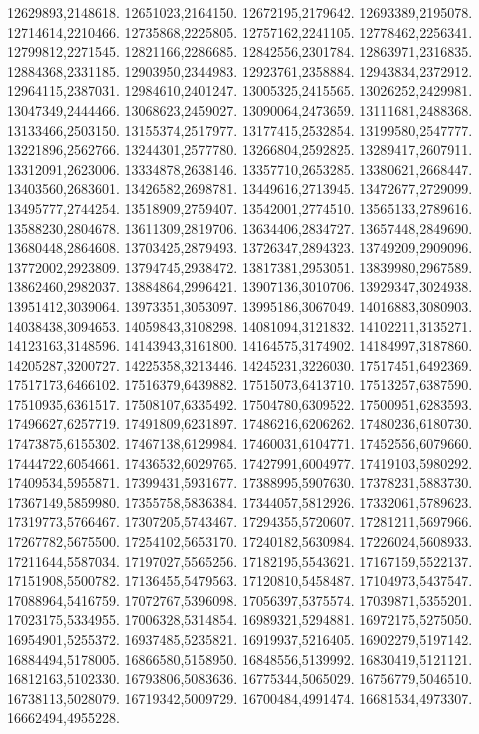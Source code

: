 12629893,2148618.
12651023,2164150.
12672195,2179642.
12693389,2195078.
12714614,2210466.
12735868,2225805.
12757162,2241105.
12778462,2256341.
12799812,2271545.
12821166,2286685.
12842556,2301784.
12863971,2316835.
12884368,2331185.
12903950,2344983.
12923761,2358884.
12943834,2372912.
12964115,2387031.
12984610,2401247.
13005325,2415565.
13026252,2429981.
13047349,2444466.
13068623,2459027.
13090064,2473659.
13111681,2488368.
13133466,2503150.
13155374,2517977.
13177415,2532854.
13199580,2547777.
13221896,2562766.
13244301,2577780.
13266804,2592825.
13289417,2607911.
13312091,2623006.
13334878,2638146.
13357710,2653285.
13380621,2668447.
13403560,2683601.
13426582,2698781.
13449616,2713945.
13472677,2729099.
13495777,2744254.
13518909,2759407.
13542001,2774510.
13565133,2789616.
13588230,2804678.
13611309,2819706.
13634406,2834727.
13657448,2849690.
13680448,2864608.
13703425,2879493.
13726347,2894323.
13749209,2909096.
13772002,2923809.
13794745,2938472.
13817381,2953051.
13839980,2967589.
13862460,2982037.
13884864,2996421.
13907136,3010706.
13929347,3024938.
13951412,3039064.
13973351,3053097.
13995186,3067049.
14016883,3080903.
14038438,3094653.
14059843,3108298.
14081094,3121832.
14102211,3135271.
14123163,3148596.
14143943,3161800.
14164575,3174902.
14184997,3187860.
14205287,3200727.
14225358,3213446.
14245231,3226030.
17517451,6492369.
17517173,6466102.
17516379,6439882.
17515073,6413710.
17513257,6387590.
17510935,6361517.
17508107,6335492.
17504780,6309522.
17500951,6283593.
17496627,6257719.
17491809,6231897.
17486216,6206262.
17480236,6180730.
17473875,6155302.
17467138,6129984.
17460031,6104771.
17452556,6079660.
17444722,6054661.
17436532,6029765.
17427991,6004977.
17419103,5980292.
17409534,5955871.
17399431,5931677.
17388995,5907630.
17378231,5883730.
17367149,5859980.
17355758,5836384.
17344057,5812926.
17332061,5789623.
17319773,5766467.
17307205,5743467.
17294355,5720607.
17281211,5697966.
17267782,5675500.
17254102,5653170.
17240182,5630984.
17226024,5608933.
17211644,5587034.
17197027,5565256.
17182195,5543621.
17167159,5522137.
17151908,5500782.
17136455,5479563.
17120810,5458487.
17104973,5437547.
17088964,5416759.
17072767,5396098.
17056397,5375574.
17039871,5355201.
17023175,5334955.
17006328,5314854.
16989321,5294881.
16972175,5275050.
16954901,5255372.
16937485,5235821.
16919937,5216405.
16902279,5197142.
16884494,5178005.
16866580,5158950.
16848556,5139992.
16830419,5121121.
16812163,5102330.
16793806,5083636.
16775344,5065029.
16756779,5046510.
16738113,5028079.
16719342,5009729.
16700484,4991474.
16681534,4973307.
16662494,4955228.

